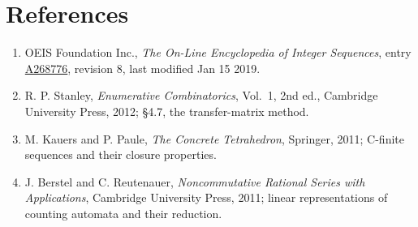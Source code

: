 \documentclass[11pt]{article}
\theoremstyle{definition}
\begin{document}
\section{References}

\begin{enumerate}

\item OEIS Foundation Inc., \emph{The On-Line Encyclopedia of Integer Sequences}, entry \href{https://oeis.org/A268776}{A268776}, revision 8, last modified Jan 15 2019.

\item R. P. Stanley, \emph{Enumerative Combinatorics}, Vol.~1, 2nd ed., Cambridge University Press, 2012; \S4.7, the transfer-matrix method.

\item M. Kauers and P. Paule, \emph{The Concrete Tetrahedron}, Springer, 2011; C-finite sequences and their closure properties.

\item J. Berstel and C. Reutenauer, \emph{Noncommutative Rational Series with Applications}, Cambridge University Press, 2011; linear representations of counting automata and their reduction.

\end{enumerate}
\end{document}
